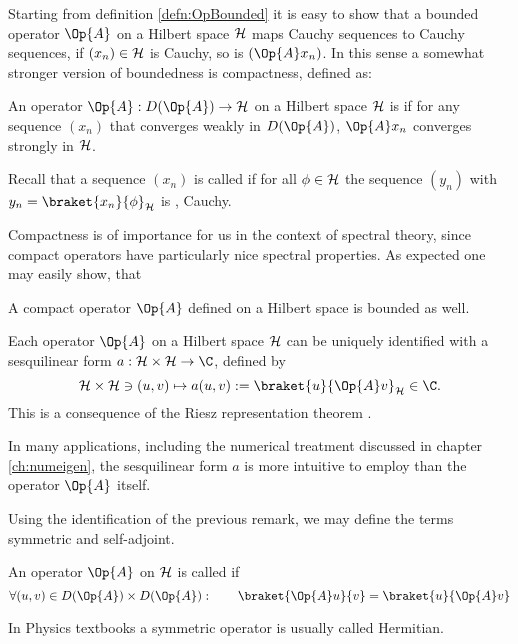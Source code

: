 Starting from definition \ref{defn:OpBounded}
it is easy to show that a bounded operator $\Op{A}$ on a Hilbert
space $\mathcal{H}$ maps Cauchy sequences to Cauchy sequences,
\ie if $(x_n) \in \mathcal{H}$ is Cauchy, so is $(\Op{A} x_n)$.
In this sense a somewhat stronger version of boundedness
is compactness, defined as:
\begin{defn}
	An operator $\Op{A} : D(\Op{A}) \to \hilbert$ on a Hilbert space $\mathcal{H}$
	is 
	if for any sequence $(x_n)$ that converges weakly in $D(\Op{A})$,
	$\Op{A} x_n$ converges strongly in $\mathcal{H}$.

	Recall that a sequence $(x_n)$ is called 
	if for all $\phi \in \mathcal{H}$ the sequence $(y_n)$ with
	$y_n = \braket{x_n}{\phi}_\hilbert$
	is , \ie Cauchy.
\end{defn}
Compactness is of importance for us in the context of spectral theory,
since compact operators have particularly nice spectral properties.
As expected one may easily show, that~\cite{Werner2011}
\begin{prop}
	A compact operator $\Op{A}$ defined on a Hilbert space is bounded as well.
\end{prop}

\begin{rem}
\label{rem:OpRietz}
Each operator $\Op{A}$ on a Hilbert space $\mathcal{H}$ can be
uniquely identified with a sesquilinear form
$a : \hilbert \times \hilbert \to \C$, defined by
\begin{equation}
	\hilbert \times \hilbert \ni (u, v) \mapsto a(u, v) := \braket{u}{\Op{A} v}_\hilbert \in \C.
	\label{eqn:formA}
\end{equation}
This is a consequence of the Riesz representation theorem \cite{DiracNotation}.

In many applications, including the numerical treatment discussed in chapter
\vref{ch:numeigen},
the sesquilinear form $a$ is more intuitive to employ than the operator $\Op{A}$ itself.
\end{rem}

Using the identification of the previous remark,
we may define the terms symmetric and self-adjoint.
\begin{defn}
	\label{def:SymmetricOperator}
	An operator $\Op{A}$ on $\mathcal{H}$ is called 
	if
	\[ \forall (u, v) \in D(\Op{A}) \times D(\Op{A}): \qquad \braket{\Op{A} u}{v} = \braket{u}{\Op{A} v} \]
\end{defn}
\noindent
In Physics textbooks a symmetric operator is usually called Hermitian.

